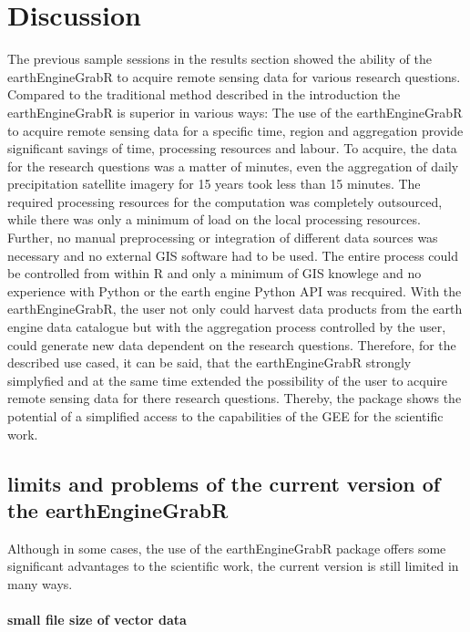 \chapter{Discussion}


The previous sample sessions in the results section showed the ability of the earthEngineGrabR to acquire remote sensing data for various research questions.
Compared to the traditional method described in the introduction the earthEngineGrabR is superior in various ways:
The use of the earthEngineGrabR to acquire remote sensing data for a specific time, region and aggregation provide significant savings of time, processing resources and labour. To acquire, the data for the research questions was a matter of minutes, even the aggregation of daily precipitation satellite imagery for 15 years took less than 15 minutes. The required processing resources for the computation was completely outsourced, while there was only a minimum of load on the local processing resources. Further, no manual preprocessing or integration of different data sources was necessary and no external GIS software had to be used. The entire process could be controlled from within R and only a minimum of GIS knowlege and no experience with Python or the earth engine Python API was recquired. With the earthEngineGrabR, the user not only could harvest data products from the earth engine data catalogue but with the aggregation process controlled by the user, could generate new data dependent on the research questions. 
Therefore, for the described use cased, it can be said, that the earthEngineGrabR strongly simplyfied and at the same time extended the possibility of the user to acquire remote sensing data for there research questions.
Thereby, the package shows the potential of a simplified access to the capabilities of the GEE for the scientific work.

\section{limits and problems of the current version of the earthEngineGrabR}

Although in some cases, the use of the earthEngineGrabR package offers some significant advantages to the scientific work, the current version is still limited in many ways. 

\subsubsection{small file size of vector data}


